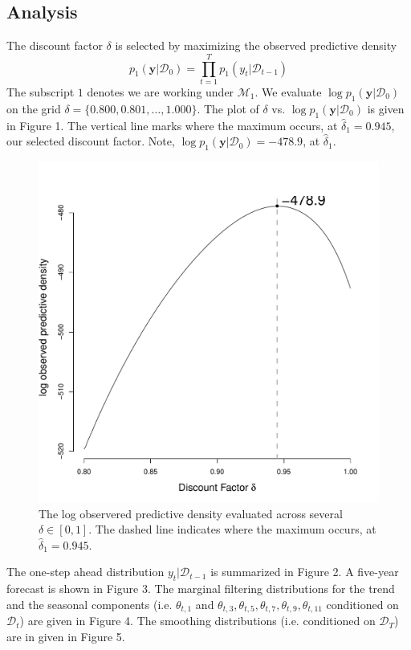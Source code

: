 \documentclass[12pt]{article}
\newcommand{\m}[1]{\mathbf{\bm{#1}}}
\begin{document}
\subsection*{Analysis}

\noindent The discount factor $\delta$ is selected by maximizing the observed predictive density
\[ p_1(\m{y}|\mathcal{D}_0) = \prod_{t=1}^T p_1(y_t|\mathcal{D}_{t-1}) \]
\noindent The subscript $1$ denotes we are working under $\mathcal{M}_1$. We evaluate $\log p_1(\m{y}|\mathcal{D}_0)$ on the grid $\delta=\{0.800, 0.801,\ldots,1.000\}$. The plot of $\delta$ vs. $\log p_1(\m{y}|\mathcal{D}_0)$ is given in Figure 1. The vertical line marks where the maximum occurs, at $\hat{\delta}_1=0.945$, our selected discount factor. Note, $\log p_1(\m{y}|\mathcal{D}_0)=-478.9$, at $\hat{\delta}_1$.
\bigskip

\begin{figure}[H]
\begin{center}
\includegraphics[scale=0.34]{figs/m1_discount.pdf}
\end{center}
\caption{The log observered predictive density evaluated across several $\delta\in[0,1]$. The dashed line indicates where the maximum occurs, at $\hat{\delta}_1=0.945$.}
\end{figure}

\noindent The one-step ahead distribution $y_t|\mathcal{D}_{t-1}$ is summarized in Figure 2. A five-year forecast is shown in Figure 3. The marginal filtering distributions for the trend and the seasonal components (i.e. $\theta_{t,1}$ and $\theta_{t,3}, \theta_{t,5}, \theta_{t,7}, \theta_{t,9}, \theta_{t,11}$ conditioned on $\mathcal{D}_t$) are given in Figure 4. The smoothing distributions (i.e. conditioned on $\mathcal{D}_T$) are in given in Figure 5.
\bigskip
\end{document}
